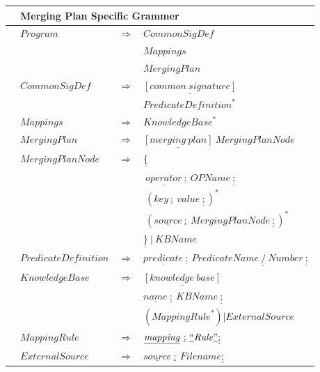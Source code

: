 \documentclass[a4paper,11pt]{article}
\theoremstyle{definition}
\begin{document}
\begin{tabularx}{\textwidth}{p{0in}llX}
					\hline
					& \multicolumn{3}{l}{Merging Plan Specific Grammer} \\
					\hline
					
					&	$\mathit{Program}$										&	$\Rightarrow$	&	$\mathit{CommonSigDef}$ \\
					&															&					&	$\mathit{Mappings}$ \\
					&															&					&	$\mathit{MergingPlan}$ \\
					&	$\mathit{CommonSigDef}$									&	$\Rightarrow$	&	$\underline{[\mathit{common\ signature}]}$ \\
					&															&					&	$\mathit{PredicateDefinition}^{*}$ \\
					&	$\mathit{Mappings}$										&	$\Rightarrow$	&	$\mathit{KnowledgeBase}^{*}$ \\
					&	$\mathit{MergingPlan}$									&	$\Rightarrow$	&	$\underline{[\mathit{merging\ plan}]} \  \mathit{MergingPlanNode}$ \\
					&	$\mathit{MergingPlanNode}$								&	$\Rightarrow$	&	$\underline{\{}$ \\
					&															&					&	$\  \underline{\mathit{operator}} \ \underline{:} \  \mathit{OPName} \  \underline{;}$ \\
					&															&					&	$\  (\mathit{key} \ \underline{:} \  \mathit{value} \  \underline{;})^{*}$ \\
					&															&					&	$\  (\underline{\mathit{source}} \ \underline{:} \  \mathit{MergingPlanNode} \  \underline{;})^{*}$ \\
					&															&					&	$\underline{\}} \  | \  KBName$ \\
					&	$\mathit{PredicateDefinition}$							&	$\Rightarrow$	&	$\underline{\mathit{predicate}} \ \underline{:} \  \mathit{PredicateName}  \  \underline{/} \  \mathit{Number} \  \underline{;}$ \\
					&	$\mathit{KnowledgeBase}$								&	$\Rightarrow$	&	$\underline{[\mathit{knowledge\ base}]}$ \\
					&															&					&	$\underline{\mathit{name}} \ \underline{:} \  \mathit{KBName} \  \underline{;}$ \\
					&															&					&	$(\mathit{MappingRule}^{*}) | \mathit{ExternalSource}$ \\
					&	$\mathit{MappingRule}$									&	$\Rightarrow$	&	$\underline{\mathit{mapping}} \ \underline{:} \  \underline{``} \mathit{Rule} \underline{"} \underline{;}$ \\
					&	$\mathit{ExternalSource}$								&	$\Rightarrow$	&	$\underline{\mathit{source}} \ \underline{:} \  \mathit{Filename} \underline{;}$ \\

\end{tabularx}
\end{document}
